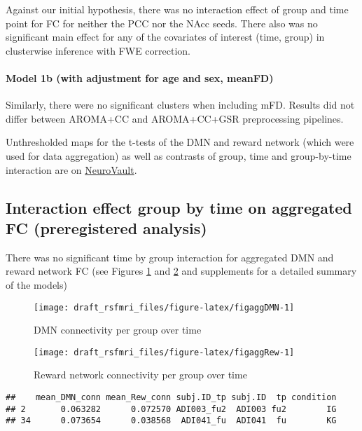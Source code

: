 \documentclass[
]{article}
\begin{document}
Against our initial hypothesis, there was no interaction effect of group and time point for FC for neither the PCC nor the NAcc seeds. There also was no significant main effect for any of the covariates of interest (time, group) in clusterwise inference with FWE correction.

\hypertarget{model-1b-with-adjustment-for-age-and-sex-meanfd}{%
\paragraph{Model 1b (with adjustment for age and sex, meanFD)}\label{model-1b-with-adjustment-for-age-and-sex-meanfd}}

Similarly, there were no significant clusters when including mFD. Results did not differ between AROMA+CC and AROMA+CC+GSR preprocessing pipelines.

Unthresholded maps for the t-tests of the DMN and reward network (which were used for data aggregation) as well as contrasts of group, time and group-by-time interaction are on \href{insert\%20link\%20here}{NeuroVault}.

\hypertarget{interaction-effect-group-by-time-on-aggregated-fc-preregistered-analysis}{%
\subsection{Interaction effect group by time on aggregated FC (preregistered analysis)}\label{interaction-effect-group-by-time-on-aggregated-fc-preregistered-analysis}}

There was no significant time by group interaction for aggregated DMN and reward network FC (see Figures \ref{fig:figaggDMN} and \ref{fig:figaggRew} and supplements for a detailed summary of the models)

\begin{figure}
\texttt{[image: draft\_rsfmri\_files/figure-latex/figaggDMN-1]} \caption{DMN connectivity per group over time}\label{fig:figaggDMN}
\end{figure}

\begin{figure}
\texttt{[image: draft\_rsfmri\_files/figure-latex/figaggRew-1]} \caption{Reward network connectivity per group over time}\label{fig:figaggRew}
\end{figure}

\begin{verbatim}
##    mean_DMN_conn mean_Rew_conn subj.ID_tp subj.ID  tp condition
## 2       0.063282      0.072570 ADI003_fu2  ADI003 fu2        IG
## 34      0.073654      0.038568  ADI041_fu  ADI041  fu        KG
\end{verbatim}
\end{document}
